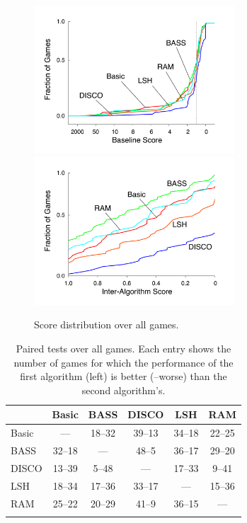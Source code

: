 \documentclass[twoside,11pt]{article}
\begin{document}
\begin{figure}
\begin{center}
\includegraphics[width=2.95in]{graphs/scoredistr_baseline.pdf}
\vspace{-2ex}
\includegraphics[width=2.95in]{graphs/scoredistr_interalgo.pdf}
\caption{Score distribution over all games.\label{fig:evaluation:score_distribution}}
\end{center}
\vspace{-4ex}
\end{figure}

\begin{table}
\begin{center}
\addtolength{\tabcolsep}{-0.8pt}
\small{
\begin{tabular}{@{}lccccc@{}}
\toprule
& Basic & BASS & DISCO & LSH & RAM \\
\midrule
Basic & --- & 18--32 & 39--13 & 34--18 & 22--25 \\ 
\hline
BASS & 32--18 & --- & 48--5 & 36--17 & 29--20 \\ 
\hline
DISCO & 13--39 & 5--48 & --- & 17--33 & 9--41 \\ 
\hline
LSH & 18--34 & 17--36 & 33--17 & --- & 15--36 \\ 
\hline
RAM & 25--22 & 20--29 & 41--9 & 36--15 & --- \\ 
\bottomrule
\vspace{-1.6em}
\end{tabular}
}
\caption{Paired tests over all games. Each entry shows the number of games for which the performance of the first algorithm (left) is better (--worse) than the second algorithm's.\label{table:paired_tests}}
\end{center}
\vspace{-2em}
\end{table}
\end{document}
